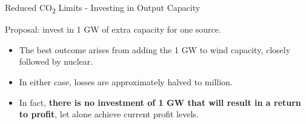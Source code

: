 \documentclass{beamer}
\begin{document}
    
    \begin{frame}{Reduced CO\textsubscript{2} Limits - Investing in Output Capacity}
    
        Proposal: invest in 1 GW of extra capacity for one source.
        
        	\pause
    
              \begin{itemize}

                  \item The best outcome arises from adding the 1 GW to wind capacity, closely followed by nuclear.
                  
                  \pause

                  \item In either case, losses are approximately halved to  million.
                  
                  \pause

                  \item {}  In fact, \textbf{there is no investment of 1 GW that will result in a return to profit}, let alone achieve current profit levels.

              \end{itemize}
        
    \end{frame}
    
    
\end{document}
